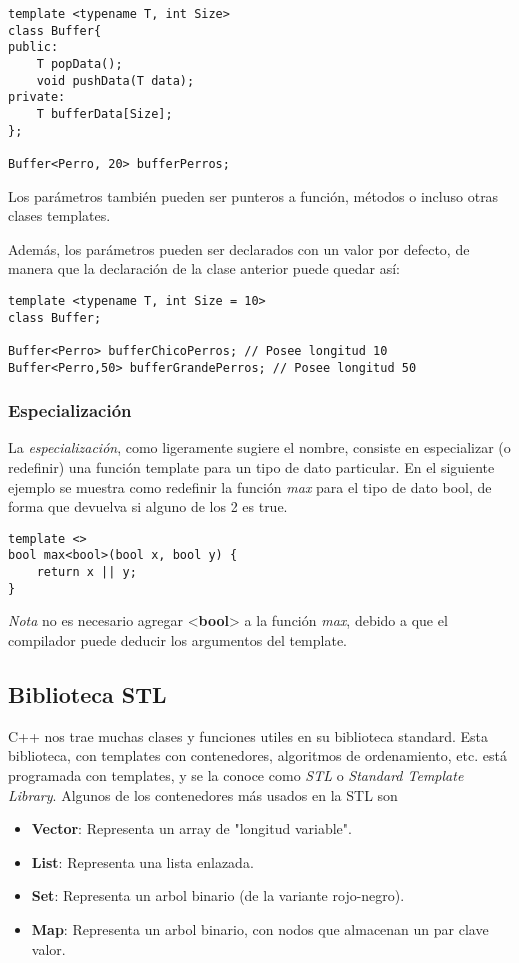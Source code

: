 \documentclass[a4paper, twoside]{article}
\begin{document}
\begin{lstlisting}
template <typename T, int Size>
class Buffer{
public:
	T popData();
	void pushData(T data);
private:
	T bufferData[Size];
};

Buffer<Perro, 20> bufferPerros;
\end{lstlisting}

Los parámetros también pueden ser punteros a función, métodos o incluso otras clases templates.

Además, los parámetros pueden ser declarados con un valor por defecto, de manera que la declaración de la clase anterior puede quedar así:

\begin{lstlisting}
template <typename T, int Size = 10>
class Buffer;

Buffer<Perro> bufferChicoPerros; // Posee longitud 10
Buffer<Perro,50> bufferGrandePerros; // Posee longitud 50
\end{lstlisting}

\subsubsection{Especialización}
La \emph{especialización}, como ligeramente sugiere el nombre, consiste en especializar (o redefinir) una función template para un tipo de dato particular. En el siguiente ejemplo se muestra como redefinir la función \emph{max} para el tipo de dato bool, de forma que devuelva si alguno de los 2 es true.

\begin{lstlisting}
template <> 
bool max<bool>(bool x, bool y) {
    return x || y;
}
\end{lstlisting}

\emph{Nota} no es necesario agregar <\textbf{bool}> a la función \emph{max}, debido a que el compilador puede deducir los argumentos del template.

\subsection{Biblioteca STL}
C++ nos trae muchas clases y funciones utiles en su biblioteca standard. Esta biblioteca, con templates con contenedores, algoritmos de ordenamiento, etc. está programada con templates, y se la conoce como \emph{STL} o \emph{Standard Template Library}. 
Algunos de los contenedores más usados en la STL son
\begin{itemize}
	\item \textbf{Vector}: Representa un array de "longitud variable".
	\item \textbf{List}: Representa una lista enlazada.
	\item \textbf{Set}: Representa un arbol binario (de la variante rojo-negro).
	\item \textbf{Map}: Representa un arbol binario, con nodos que almacenan un par clave valor.
\end{itemize}
\end{document}
